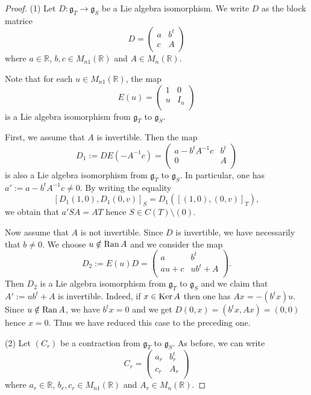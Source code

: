 \documentclass[
reqno]{amsart}
\begin{document}
\begin{proof} (1) Let $D: {\mathfrak g}_T\rightarrow {\mathfrak g}_S$ be a Lie algebra isomorphism.
We write $D$ as the block matrice 
$$D= 
\begin{pmatrix} 
a& b^t \\
c & A  \\
\end{pmatrix}$$
where $a\in {{\mathbb R}}$, $b,c\in M_{n1}({{\mathbb R}})$ and $A\in M_n({{\mathbb R}})$.

Note that for each $u\in M_{n1}({{\mathbb R}})$, the map 
$$E(u)=\begin{pmatrix} 
1& 0 \\
u & I_n  \\
\end{pmatrix}$$
is a Lie algebra isomorphism from ${\mathfrak g}_T$ to ${\mathfrak g}_S$.

First, we assume that $A$ is invertible. Then the map
$$D_1:=DE(-A^{-1}c)=\begin{pmatrix} 
a-b^tA^{-1}c& b^t \\
0 & A \\
\end{pmatrix}$$
is also a Lie algebra isomorphism from ${\mathfrak g}_T$ to ${\mathfrak g}_S$. In particular,
one has $a':=a-b^tA^{-1}c\not= 0$. By writing the equality
$$[D_1(1,0), D_1(0,v)]_S=D_1([(1,0),(0,v)]_T),$$
we obtain that $a'SA=AT$ hence $S\in C(T)\setminus (0)$.

Now assume that $A$ is not invertible. Since $D$ is invertible, we have necessarily that $b\not= 0$. 
We choose $u\notin {{\rm Ran}\,} A$ and we consider the map
$$D_2:=E(u)D=\begin{pmatrix} 
a& b^t \\
au+c & ub^t+A \\
\end{pmatrix}.$$
Then $D_2$ is a Lie algebra isomorphism from ${\mathfrak g}_T$ to ${\mathfrak g}_S$ and we claim
that $A':=ub^t+A$ is invertible. Indeed, if $x\in {{\rm Ker}\,} A$ then one has $Ax=-(b^tx)u$. Since $u\notin {{\rm Ran}\,} A$,
we have $b^tx=0$ and we get $D(0,x)=(b^tx,Ax)=(0,0)$ hence $x=0$. Thus we have reduced this case to
the preceding one.

(2) Let $(C_r)$ be a contraction from ${\mathfrak g}_T$ to ${\mathfrak g}_S$. As before, we can write
$$C_r=\begin{pmatrix} 
a_r& b_r^t \\
c_r & A_r  \\
\end{pmatrix}$$
where $a_r\in {{\mathbb R}}$, $b_r,c_r\in M_{n1}({{\mathbb R}})$ and $A_r\in M_n({{\mathbb R}})$.


\end{proof}
\end{document}
